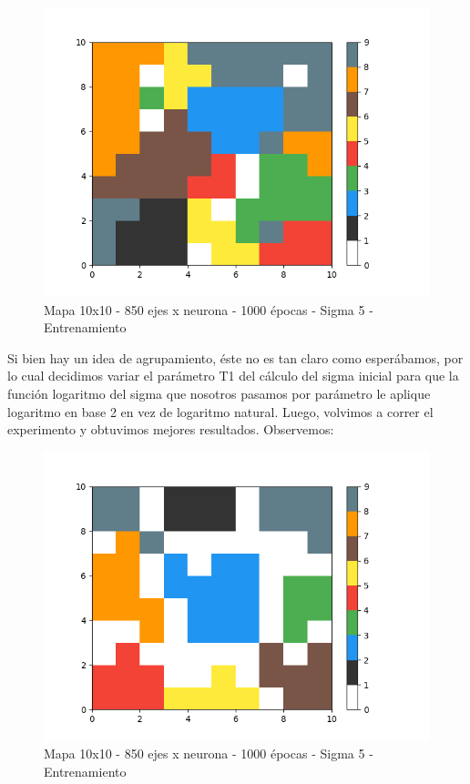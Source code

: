 \begin{figure}[h]
  \begin{center}
    \includegraphics[scale=0.6]{../img/map_1000ep_850en.png}
  \caption{Mapa 10x10 - 850 ejes x neurona - 1000 épocas - Sigma 5 - Entrenamiento}
  \end{center}
\end{figure}

Si bien hay un idea de agrupamiento, éste no es tan claro como esperábamos, por lo cual decidimos variar el parámetro T1 del cálculo del sigma inicial para que la función logaritmo del sigma que nosotros pasamos por parámetro le aplique logaritmo en base 2 en vez de logaritmo natural. Luego, volvimos a correr el experimento y obtuvimos mejores resultados. Observemos:
\newpage

\begin{figure}[h]
  \begin{center}
    \includegraphics[scale=0.6]{../img/map_1000ep_850en_v2.png}
  \caption{Mapa 10x10 - 850 ejes x neurona - 1000 épocas - Sigma 5 - Entrenamiento}
  \end{center}
\end{figure}

